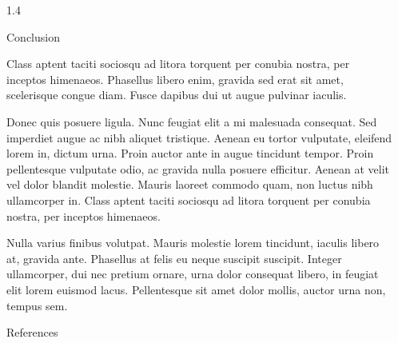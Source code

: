 \documentclass[final,notheorems]{beamer}
\newlength{\sepwidth}
\newlength{\colwidth}
\newcommand{\separatorcolumn}{\begin{column}{\sepwidth}\end{column}}
\begin{document}
\begin{frame}[t]
\begin{columns}[t]
\begin{column}{1.4\colwidth}
  \begin{alertblock}{Conclusion}

    Class aptent taciti sociosqu ad litora torquent per conubia nostra, per
    inceptos himenaeos. Phasellus libero enim, gravida sed erat sit amet,
    scelerisque congue diam. Fusce dapibus dui ut augue pulvinar iaculis.



    Donec quis posuere ligula. Nunc feugiat elit a mi malesuada consequat. Sed
    imperdiet augue ac nibh aliquet tristique. Aenean eu tortor vulputate,
    eleifend lorem in, dictum urna. Proin auctor ante in augue tincidunt
    tempor. Proin pellentesque vulputate odio, ac gravida nulla posuere
    efficitur. Aenean at velit vel dolor blandit molestie. Mauris laoreet
    commodo quam, non luctus nibh ullamcorper in. Class aptent taciti sociosqu
    ad litora torquent per conubia nostra, per inceptos himenaeos.

    Nulla varius finibus volutpat. Mauris molestie lorem tincidunt, iaculis
    libero at, gravida ante. Phasellus at felis eu neque suscipit suscipit.
    Integer ullamcorper, dui nec pretium ornare, urna dolor consequat libero,
    in feugiat elit lorem euismod lacus. Pellentesque sit amet dolor mollis,
    auctor urna non, tempus sem.

  \end{alertblock}

  \begin{block}{References}
    \footnotesize{\printbibliography}
  \end{block}

\end{column}

\separatorcolumn
\end{columns}
\end{frame}
\end{document}
